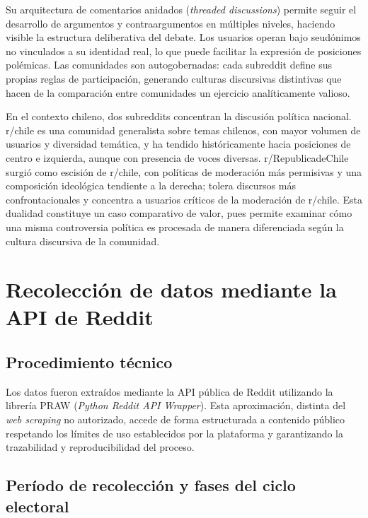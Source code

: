\documentclass[
  letterpaper,
  numbers=noendperiod,
  fontsize=11pt,
  DIV=12,
  titlepage=false]{scrreprt}
\begin{document}
Su arquitectura de comentarios anidados (\emph{threaded discussions})
permite seguir el desarrollo de argumentos y contraargumentos en
múltiples niveles, haciendo visible la estructura deliberativa del
debate. Los usuarios operan bajo seudónimos no vinculados a su identidad
real, lo que puede facilitar la expresión de posiciones polémicas. Las
comunidades son autogobernadas: cada subreddit define sus propias reglas
de participación, generando culturas discursivas distintivas que hacen
de la comparación entre comunidades un ejercicio analíticamente valioso.

En el contexto chileno, dos subreddits concentran la discusión política
nacional. r/chile es una comunidad generalista sobre temas chilenos, con
mayor volumen de usuarios y diversidad temática, y ha tendido
históricamente hacia posiciones de centro e izquierda, aunque con
presencia de voces diversas. r/RepublicadeChile surgió como escisión de
r/chile, con políticas de moderación más permisivas y una composición
ideológica tendiente a la derecha; tolera discursos más
confrontacionales y concentra a usuarios críticos de la moderación de
r/chile. Esta dualidad constituye un caso comparativo de valor, pues
permite examinar cómo una misma controversia política es procesada de
manera diferenciada según la cultura discursiva de la comunidad.

\section{Recolección de datos mediante la API de
Reddit}\label{recolecciuxf3n-de-datos-mediante-la-api-de-reddit}

\subsection{Procedimiento técnico}\label{procedimiento-tuxe9cnico}

Los datos fueron extraídos mediante la API pública de Reddit utilizando
la librería PRAW (\emph{Python Reddit API Wrapper}). Esta aproximación,
distinta del \emph{web scraping} no autorizado, accede de forma
estructurada a contenido público respetando los límites de uso
establecidos por la plataforma y garantizando la trazabilidad y
reproducibilidad del proceso.

\subsection{Período de recolección y fases del ciclo
electoral}\label{peruxedodo-de-recolecciuxf3n-y-fases-del-ciclo-electoral}
\end{document}
